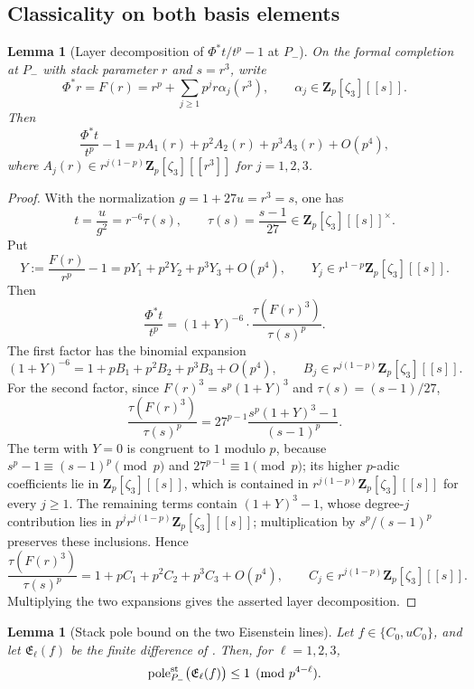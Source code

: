\documentclass[11pt]{amsart}
\newtheorem{lemma}[theorem]{Lemma}
\theoremstyle{definition}
\theoremstyle{remark}
\newcommand{\Z}{\mathbf{Z}}
\begin{document}
\subsection{Classicality on both basis elements}\label{subsec:classicality-both}


\begin{lemma}[Layer decomposition of $\Phi^*t/t^p-1$ at $P_-$]\label{lem:psi-layer-decomposition}
On the formal completion at $P_-$ with stack parameter $r$ and $s=r^3$, write
\[
\Phi^*r=F(r)=r^p+\sum_{j\ge1}p^j r\alpha_j(r^3),
\qquad \alpha_j\in\Z_p[\zeta_3][[s]].
\]
Then
\[
\frac{\Phi^*t}{t^p}-1=pA_1(r)+p^2A_2(r)+p^3A_3(r)+O(p^4),
\]
where $A_j(r)\in r^{j(1-p)}\Z_p[\zeta_3][[r^3]]$ for $j=1,2,3$.
\end{lemma}

\begin{proof}
With the normalization $g=1+27u=r^3=s$, one has
\[
t=\frac{u}{g^2}=r^{-6}\tau(s),\qquad \tau(s)=\frac{s-1}{27}\in\Z_p[\zeta_3][[s]]^\times.
\]
Put
\[
Y:=\frac{F(r)}{r^p}-1=pY_1+p^2Y_2+p^3Y_3+O(p^4),
\qquad Y_j\in r^{1-p}\Z_p[\zeta_3][[s]].
\]
Then
\[
\frac{\Phi^*t}{t^p}=(1+Y)^{-6}\cdot \frac{\tau(F(r)^3)}{\tau(s)^p}.
\]
The first factor has the binomial expansion
\[
(1+Y)^{-6}=1+pB_1+p^2B_2+p^3B_3+O(p^4),
\qquad B_j\in r^{j(1-p)}\Z_p[\zeta_3][[s]].
\]
For the second factor, since $F(r)^3=s^p(1+Y)^3$ and $\tau(s)=(s-1)/27$,
\[
\frac{\tau(F(r)^3)}{\tau(s)^p}=27^{p-1}\frac{s^p(1+Y)^3-1}{(s-1)^p}.
\]
The term with $Y=0$ is congruent to $1$ modulo $p$, because $s^p-1\equiv (s-1)^p\pmod p$ and $27^{p-1}\equiv1\pmod p$; its higher $p$-adic coefficients lie in $\Z_p[\zeta_3][[s]]$, which is contained in $r^{j(1-p)}\Z_p[\zeta_3][[s]]$ for every $j\ge1$. The remaining terms contain $(1+Y)^3-1$, whose degree-$j$ contribution lies in $p^j r^{j(1-p)}\Z_p[\zeta_3][[s]]$; multiplication by $s^p/(s-1)^p$ preserves these inclusions. Hence
\[
\frac{\tau(F(r)^3)}{\tau(s)^p}=1+pC_1+p^2C_2+p^3C_3+O(p^4),
\qquad C_j\in r^{j(1-p)}\Z_p[\zeta_3][[s]].
\]
Multiplying the two expansions gives the asserted layer decomposition.
\end{proof}

\begin{lemma}[Stack pole bound on the two Eisenstein lines]\label{lem:pole-bound-El}
Let $f\in\{C_0,uC_0\}$, and let $\mathfrak E_\ell(f)$ be the finite difference of . Then, for $\ell=1,2,3$,
\[
\operatorname{pole}^{\rm st}_{P_-}\bigl(\mathfrak E_\ell(f)\bigr)\le 1\pmod{p^{4-\ell}}.
\]
\end{lemma}
\end{document}
